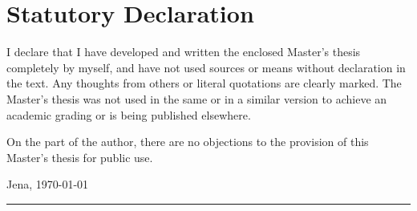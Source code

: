 \documentclass[crop=false]{standalone}
\begin{document}


  \section*{Statutory Declaration}
  \thispagestyle{empty}
  I declare that I have developed and written the enclosed Master's thesis completely by myself, and have not used sources or means without declaration in the text.
  Any thoughts from others or literal quotations are clearly marked.
  The Master's thesis was not used in the same or in a similar version to achieve an academic grading or is being published elsewhere.

  \noindent
  On the part of the author, there are no objections to the provision of this Master's thesis for public use.

  \vspace{2\baselineskip}

  \noindent
  Jena, \today

  \noindent
  \hfill\rule{0.4\textwidth}{0.5pt}
  \vspace{0.1pt} \\
  {\\}
  \restoregeometry
\end{document}
